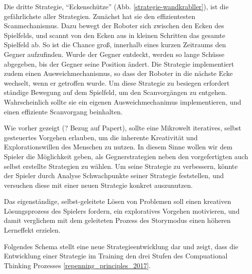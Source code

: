 
Die dritte Strategie, \enquote{Eckenschütze} (Abb. \ref{strategie-wandkrabller}), ist die
gefährlichste aller Strategien. Zunächst hat sie den effizientesten Scanmechanismus. Dazu bewegt der
Roboter sich zwischen den Ecken des Spielfelds, und scannt von den Ecken aus in kleinen Schritten
das gesamte Spielfeld ab. So ist die Chance groß, innerhalb eines kurzen Zeitraums den Gegner
aufzufinden. Wurde der Gegner entdeckt, werden so lange Schüsse abgegeben, bis der Gegner seine
Position ändert. Die Strategie implementiert zudem einen Ausweichmechanismus, so dass der Roboter in die
nächste Ecke wechselt, wenn er getroffen wurde. Um diese Strategie zu besiegen erfordert ständige
Bewegung auf dem Spielfeld, um den Scanvorgängen zu entgehen. Wahrscheinlich sollte sie ein eigenen
Ausweichmechanimus implementieren, und einen effiziente Scanvorgang beinhalten.

Wie vorher gezeigt (? Bezug auf Papert), sollte eine Mikrowelt iteratives, selbst gesteuertes
Vorgehen erlauben, um die inherente Kreativität und Explorationswillen des Menschen zu nutzen. In
diesem Sinne wollen wir dem Spieler die Möglichkeit geben, als Gegnerstrategien neben den
vorgefertigten auch selbst erstellte Strategien zu wählen. Um seine Strategie zu verbessern, könnte
der Spieler durch Analyse Schwachpunkte seiner Strategie feststellen, und versuchen diese mit einer neuen
Strategie konkret auszunutzen.

Das eigenständige, selbst-geleitete Lösen von Problemen soll einen kreativen Lösungsprozess des
Spielers fordern, ein exploratives Vorgehen motivieren, und damit verglichem mit dem geleiteten
Prozess des Storymodus einen höheren Lerneffekt erzielen.

Folgendes Schema stellt eine neue Strategieentwicklung dar und zeigt, dass die Entwicklung einer
Strategie im Training den drei Stufen des Compuational Thinking Prozesses \ref{repenning_principles_2017}.

